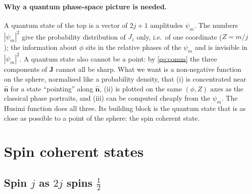 \documentclass[11pt,a4paper]{article}
\newcommand{\vJ}{\bm{J}}
\newcommand{\vn}{\hat{\bm n}}
\begin{document}
\paragraph{Why a quantum phase-space picture is needed.} A quantum state of the top is a vector of $2j+1$ amplitudes
$\psi_m$. The numbers $|\psi_m|^2$ give the probability distribution of $J_z$ only, i.e.\ of one coordinate ($Z = m/j$);
the information about $\phi$ sits in the relative phases of the $\psi_m$ and is invisible in $|\psi_m|^2$. A quantum
state also cannot be a point: by \eqref{eq:comm} the three components of $\vJ$ cannot all be sharp. What we want is a
non-negative function on the sphere, normalised like a probability density, that (i) is concentrated near $\vn$ for a
state ``pointing'' along $\vn$, (ii) is plotted on the same $(\phi,Z)$ axes as the classical phase portraits, and
(iii) can be computed cheaply from the $\psi_m$. The Husimi function does all three. Its building block is the quantum
state that is as close as possible to a point of the sphere: the spin coherent state.

\section{Spin coherent states}\label{sec:coherent}

\subsection{Spin \texorpdfstring{$j$}{j} as \texorpdfstring{$2j$}{2j} spins \texorpdfstring{$\frac12$}{1/2}}\label{sec:two-j}
\end{document}
